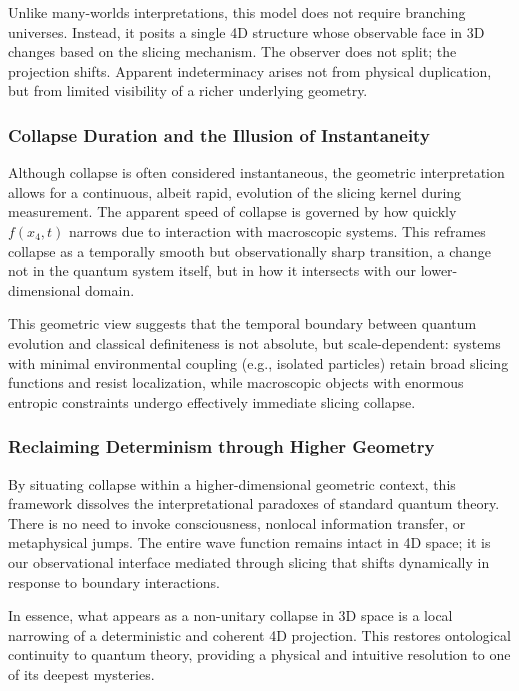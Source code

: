 \documentclass[12pt]{article}
\begin{document}
Unlike many-worlds interpretations, this model does not require branching universes. Instead, it posits a single 4D structure whose observable face in 3D changes based on the slicing mechanism. The observer does not split; the projection shifts. Apparent indeterminacy arises not from physical duplication, but from limited visibility of a richer underlying geometry.

\subsubsection*{Collapse Duration and the Illusion of Instantaneity}

Although collapse is often considered instantaneous, the geometric interpretation allows for a continuous, albeit rapid, evolution of the slicing kernel during measurement. The apparent speed of collapse is governed by how quickly $f(x_4, t)$ narrows due to interaction with macroscopic systems. This reframes collapse as a temporally smooth but observationally sharp transition, a change not in the quantum system itself, but in how it intersects with our lower-dimensional domain.

This geometric view suggests that the temporal boundary between quantum evolution and classical definiteness is not absolute, but scale-dependent: systems with minimal environmental coupling (e.g., isolated particles) retain broad slicing functions and resist localization, while macroscopic objects with enormous entropic constraints undergo effectively immediate slicing collapse.

\subsubsection*{Reclaiming Determinism through Higher Geometry}

By situating collapse within a higher-dimensional geometric context, this framework dissolves the interpretational paradoxes of standard quantum theory. There is no need to invoke consciousness, nonlocal information transfer, or metaphysical jumps. The entire wave function remains intact in 4D space; it is our observational interface mediated through slicing that shifts dynamically in response to boundary interactions.

In essence, what appears as a non-unitary collapse in 3D space is a local narrowing of a deterministic and coherent 4D projection. This restores ontological continuity to quantum theory, providing a physical and intuitive resolution to one of its deepest mysteries.
\end{document}
